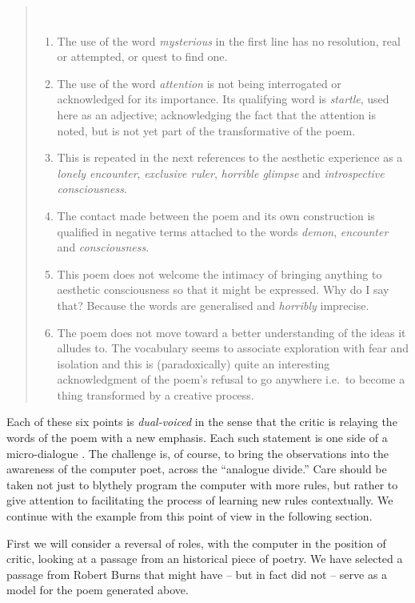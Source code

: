 \begin{quotation}
~\vspace{-1\baselineskip}
\begin{enumerate}
\item The use of the word \emph{mysterious} in the first line has no
  resolution, real or attempted, or quest to find one.
%
\item The use of the word \emph{attention} is not being interrogated
  or acknowledged for its importance.  Its qualifying word is
  \emph{startle}, used here as an adjective; acknowledging the fact
  that the attention is noted, but is not yet part of the transformative
  of the poem.
%
\item This is repeated in the next references to the aesthetic
  experience as a \emph{lonely encounter}, \emph{exclusive
    ruler}, \emph{horrible glimpse} and \emph{introspective consciousness}.
%
\item The contact made between the poem and its own
  construction is qualified in negative terms attached to the words
  \emph{demon}, \emph{encounter} and \emph{consciousness}.
%
\item This poem does not welcome the intimacy of bringing anything to
  aesthetic consciousness so that it might be expressed. Why do I say
  that? Because the words are generalised and \emph{horribly}
  imprecise.
%
\item  The poem does not move toward a better understanding of the ideas it alludes to.
  The vocabulary seems to associate exploration with fear and isolation and this is
  (paradoxically) quite an interesting acknowledgment of the poem’s
  refusal to go anywhere i.e.~to become a thing transformed by a creative
  process.
\end{enumerate}
\end{quotation}

Each of these six points is \emph{dual-voiced} in the sense that the
critic is relaying the words of the poem with a new emphasis.  Each such
statement is one side of a micro-dialogue
\cite[p. 73]{bakhtin1984problems}.  The challenge is, of course, to
bring the observations into the awareness of the computer poet, across
the ``analogue divide.''
%
Care should be taken not just to blythely program the computer with more rules, but
rather to give attention to facilitating the process of learning new rules contextually.
We continue with the example from this point of view in the following section.

First we will consider a reversal of roles, with the
computer in the position of critic, looking at a passage from an
historical piece of poetry.  We have selected a passage from Robert Burns that might have --
but in fact did not -- serve as a model for the poem generated above.

